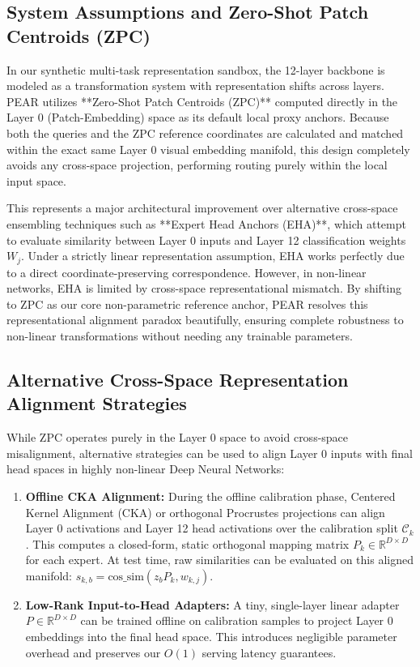 \documentclass{article}
\theoremstyle{plain}
\theoremstyle{definition}
\theoremstyle{remark}
\begin{document}
\subsection{System Assumptions and Zero-Shot Patch Centroids (ZPC)}
In our synthetic multi-task representation sandbox, the 12-layer backbone is modeled as a transformation system with representation shifts across layers. PEAR utilizes **Zero-Shot Patch Centroids (ZPC)** computed directly in the Layer 0 (Patch-Embedding) space as its default local proxy anchors. Because both the queries and the ZPC reference coordinates are calculated and matched within the exact same Layer 0 visual embedding manifold, this design completely avoids any cross-space projection, performing routing purely within the local input space.

This represents a major architectural improvement over alternative cross-space ensembling techniques such as **Expert Head Anchors (EHA)**, which attempt to evaluate similarity between Layer 0 inputs and Layer 12 classification weights $W_j$. Under a strictly linear representation assumption, EHA works perfectly due to a direct coordinate-preserving correspondence. However, in non-linear networks, EHA is limited by cross-space representational mismatch. By shifting to ZPC as our core non-parametric reference anchor, PEAR resolves this representational alignment paradox beautifully, ensuring complete robustness to non-linear transformations without needing any trainable parameters.

\subsection{Alternative Cross-Space Representation Alignment Strategies}
While ZPC operates purely in the Layer 0 space to avoid cross-space misalignment, alternative strategies can be used to align Layer 0 inputs with final head spaces in highly non-linear Deep Neural Networks:
\begin{enumerate}
    \item \textbf{Offline CKA Alignment:} During the offline calibration phase, Centered Kernel Alignment (CKA) or orthogonal Procrustes projections can align Layer 0 activations and Layer 12 head activations over the calibration split $\mathcal{C}_k$. This computes a closed-form, static orthogonal mapping matrix $P_k \in \mathbb{R}^{D \times D}$ for each expert. At test time, raw similarities can be evaluated on this aligned manifold: $s_{k, b} = \text{cos\_sim}(z_b P_k, w_{k, j})$.
    \item \textbf{Low-Rank Input-to-Head Adapters:} A tiny, single-layer linear adapter $P \in \mathbb{R}^{D \times D}$ can be trained offline on calibration samples to project Layer 0 embeddings into the final head space. This introduces negligible parameter overhead and preserves our $O(1)$ serving latency guarantees.
\end{enumerate}
\end{document}
